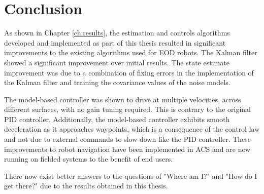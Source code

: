 \chapter{Conclusion}
\label{ch:conclusion}
As shown in Chapter \ref{ch:results}, the estimation and controls algorithms developed and implemented as part of this thesis resulted in significant improvements to the existing algorithms used for EOD robots. The Kalman filter showed a significant improvement over initial results. The state estimate improvement was due to a combination of fixing errors in the implementation of the Kalman filter and training the covariance values of the noise models.

The model-based controller was shown to drive at multiple velocities, across different surfaces, with no gain tuning required. This is contrary to the original PID controller. Additionally, the model-based controller exhibits smooth deceleration as it approaches waypoints, which is a consequence of the control law and not due to external commands to slow down like the PID controller. These improvements to robot navigation have been implemented in ACS and are now running on fielded systems to the benefit of end users.

There now exist better answers to the questions of "Where am I?" and "How do I get there?" due to the results obtained in this thesis.

